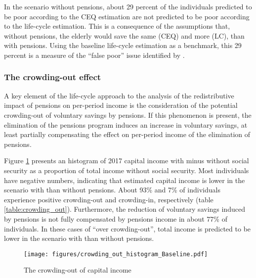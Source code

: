 \documentclass{article}
\begin{document}
In the scenario without pensions, about 29 percent of the individuals predicted to be poor according to the CEQ estimation are not predicted to be poor according to the life-cycle estimation.
This is a consequence of the assumptions that, without pensions, the elderly would save the same (CEQ) and more (LC), than with pensions. Using the baseline life-cycle estimation as a benchmark, this 29 percent is a measure of the ``false poor'' issue identified by \textcite{Lustig2022c}. 

\subsubsection{The crowding-out effect} \label{subsubsec:co}

A key element of the life-cycle approach to the analysis of the redistributive impact of pensions on per-period income is the consideration of the potential crowding-out of voluntary savings by pensions. If this phenomenon is present, the elimination of the pensions program induces an increase in voluntary savings, at least partially compensating the effect on per-period income of the elimination of pensions.

Figure \ref{figure:crowding_out_histogram} presents an histogram of 2017 capital income with minus without social security as a proportion of total income without social security. Most individuals have negative numbers, indicating that estimated capital income is lower in the scenario with than without pensions. About 93\% and 7\% of individuals experience positive crowding-out and crowding-in, respectively (table \ref{table:crowding_out}). %
  Furthermore, the reduction of voluntary savings induced by pensions is not fully compensated by pensions income in about 77\% of individuals. In these cases of ``over crowding-out'', total income is predicted to be lower in the scenario with than without pensions.   

\begin{figure}
\centering
\caption{The crowding-out of capital income}
\texttt{[image: figures/crowding\_out\_histogram\_Baseline.pdf]} 
\label{figure:crowding_out_histogram}
\end{figure}
\end{document}
